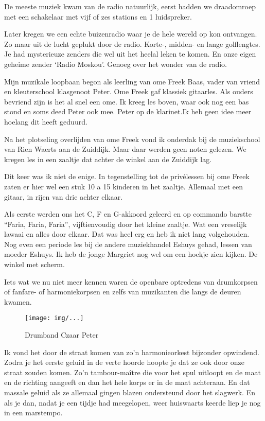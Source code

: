 \documentclass[10pt,twoside,openright]{memoir}
\begin{document}
De meeste muziek kwam van de radio natuurlijk, eerst hadden we draadomroep met een schakelaar met vijf of zes stations en 1 luidspreker. 

Later kregen we een echte buizenradio waar je de hele wereld op kon ontvangen. Zo maar uit de lucht geplukt door de radio. Korte-, midden- en lange golflengtes. Je had mysterieuze zenders die wel uit het heelal leken te komen. En onze eigen geheime zender ‘Radio Moskou’. Genoeg over het wonder van de radio.

Mijn muzikale loopbaan begon als leerling van ome Freek Baas, vader van vriend en kleuterschool klasgenoot Peter. Ome Freek gaf klassiek gitaarles. Als ouders bevriend zijn is het al snel een ome. Ik kreeg les boven, waar ook nog een bas stond en soms deed Peter ook mee. Peter op de klarinet.Ik heb geen idee meer hoelang dit heeft geduurd. 

Na het plotseling overlijden van ome Freek vond ik onderdak bij de muziekschool van Rien Waerts aan de Zuiddijk. Maar daar werden geen noten gelezen. We kregen les in een zaaltje dat achter de winkel aan de Zuiddijk lag. 

Dit keer was ik niet de enige. In tegenstelling tot de privélessen bij ome Freek zaten er hier wel een stuk 10 a 15 kinderen in het zaaltje. Allemaal met een gitaar, in rijen van drie achter elkaar. 

Als eerste werden ons het C, F en G-akkoord geleerd en op commando barstte “Faria, Faria, Faria”, vijftienvoudig door het kleine zaaltje. Wat een vreselijk lawaai en alles door elkaar. Dat was heel erg en heb ik niet lang volgehouden. Nog even een periode les bij de andere muziekhandel Eshuys gehad, lessen van moeder Eshuys. Ik heb de jonge Margriet nog wel om een hoekje zien kijken. De winkel met scherm.

Iets wat we nu niet meer kennen waren de openbare optredens van drumkorpsen of fanfare- of harmoniekorpsen en zelfs van muzikanten die langs de deuren kwamen. 

\begin{figure}[t]
\texttt{[image: img/...]}
\caption{Drumband Czaar Peter}
\end{figure}

Ik vond het door de straat komen van zo’n harmonieorkest bijzonder opwindend. Zodra je het eerste geluid in de verte hoorde hoopte je dat ze ook door onze straat zouden komen. Zo’n tambour-maître die voor het spul uitloopt en de maat en de richting aangeeft en dan het hele korps er in de maat achteraan. En dat massale geluid als ze allemaal gingen blazen ondersteund door het slagwerk. En als je dan, nadat je een tijdje had meegelopen, weer huiswaarts keerde liep je nog in een marstempo.
\end{document}
